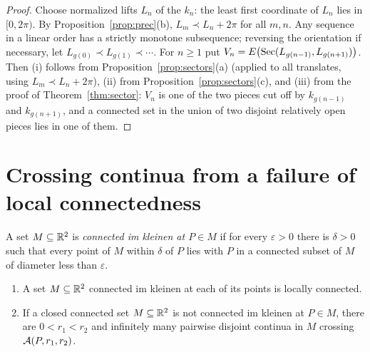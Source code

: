 \begin{proof}
Choose normalized lifts $L_n$ of the $k_n$: the least first coordinate of $L_n$ lies in $[0,2\pi)$. By Proposition~\ref{prop:prec}(b), $L_m\prec L_n+2\pi$ for all $m,n$. Any sequence in a linear
order has a strictly monotone subsequence; reversing the orientation if necessary, let $L_{g(0)}\prec L_{g(1)}\prec\cdots$. For $n\ge1$ put $V_n=E\bigl(\operatorname{Sec}(L_{g(n-1)},L_{g(n+1)})\bigr)$.
Then (i) follows from Proposition~\ref{prop:sectors}(a) (applied to all translates, using $L_m\prec L_n+2\pi$), (ii) from Proposition~\ref{prop:sectors}(c), and (iii) from the proof of
Theorem~\ref{thm:sector}: $V_n$ is one of the two pieces cut off by $k_{g(n-1)}$ and $k_{g(n+1)}$, and a connected set in the union of two disjoint relatively open pieces lies in one of
them.
\end{proof}


\section{Crossing continua from a failure of local connectedness}

\begin{definition}\label{def:cik}
A set $M\subseteq\mathbb{R}^2$ is \emph{connected im kleinen at $P\in M$} if for every $\varepsilon>0$ there is $\delta>0$ such that every point of $M$ within $\delta$ of $P$ lies with $P$ in a connected
subset of $M$ of diameter less than $\varepsilon$.
\end{definition}


\begin{proposition}\label{prop:cik}
\leavevmode
\begin{enumerate}[label=(\alph*)]
\item A set $M\subseteq\mathbb{R}^2$ connected im kleinen at each of its points is locally connected.
\item If a closed connected set $M\subseteq\mathbb{R}^2$ is not connected im kleinen at $P\in M$, there are $0<r_1<r_2$ and infinitely many pairwise disjoint continua in $M$ crossing $\mathcal{A}(P,r_1,r_2)$.
\end{enumerate}
\end{proposition}

